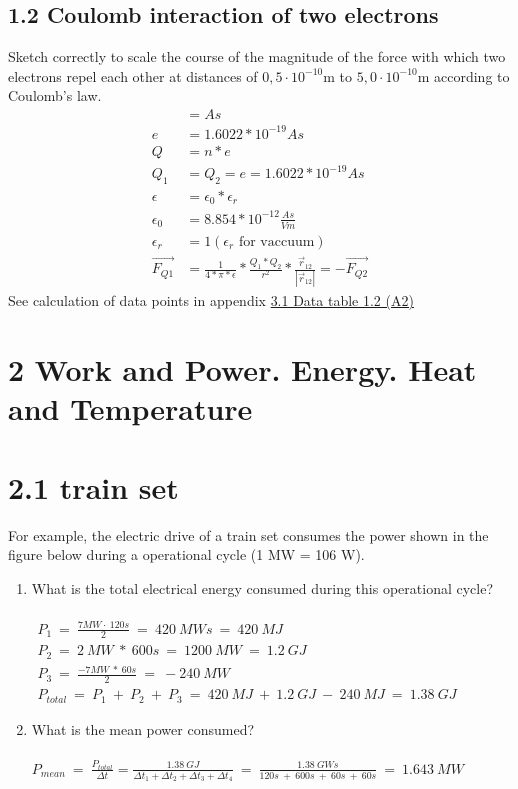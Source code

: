 \documentclass[10pt,ngerman]{scrartcl}
\begin{document}
\subsection{1.2 Coulomb interaction of two electrons}
Sketch correctly to scale the course of the magnitude of the force with which two electrons repel each other at distances of $0,5 \cdot 10^{-10}$m to $5,0 \cdot 10^{-10}$m according to Coulomb's law.
\begin{align}
	[Q] &= As \\
	e &= 1.6022 * 10^{-19} As \\
	Q &= n * e \\
	Q_{1} &= Q_{2} = e = 1.6022 * 10^{-19} As \\
	\epsilon &= \epsilon_{0} * \epsilon_{r} \\
	\epsilon_{0} &= 8.854 * 10^{-12} \frac{As}{Vm} \\
	\epsilon_{r} &= 1 (\epsilon_{r} \text{ for vaccuum})\\
	\vec{F_{Q1}} &= \frac{1}{4 * \pi * \epsilon } * \frac{Q_{1}*Q_{2}}{r^{2}} * \frac{\vec{r}_{12}}{|\vec{r}_{12}|} = -\vec{F_{Q2}}
\end{align}
See calculation of data points in appendix \hyperref[sec:data-table-a2]{3.1 Data table 1.2 (A2)}

\begin{landscape}
 
\end{landscape}

\newpage
\section{2 Work and Power. Energy. Heat and Temperature}
\section{2.1 train set}
For example, the electric drive of a train set consumes the power shown in the figure below during a operational cycle (1 MW = 106 W).

\begin{enumerate}
	\item What is the total electrical energy consumed during this operational cycle?\\\\
	$
	\begin{array}{l}
		P_{1} \ =\ \frac{7MW\cdot \ 120s}{2} \ =\ 420\ MWs\ =\ 420\ MJ\\
		P_{2} \ =\ 2\ MW\ *\ 600s\ =\ 1200\ MW\ =\ 1.2\ GJ\\
		P_{3} \ =\ \frac{-7MW\ *\ 60s}{2} \ =\ -240\ MW\\
		P_{total} \ =\ P_{1} \ +\ P_{2} \ +\ P_{3} \ =\ 420\ MJ\ +\ 1.2\ GJ\ -\ 240\ MJ\ =\ 1.38\ GJ
		\end{array}
	$
	\item What is the mean power consumed?\\\\
	$
        P_{mean} \ =\ \frac{P_{total}}{\Delta t} = \frac{1.38\ GJ}{\Delta t_{1} +\Delta t_{2} +\Delta t_{3} +\Delta t_{4}} \ =\ \frac{1.38\ GWs}{120s\ +\ 600s\ +\ 60s\ +\ 60s} \ =\ 1.643\ MW
    $
\end{enumerate}
\end{document}
